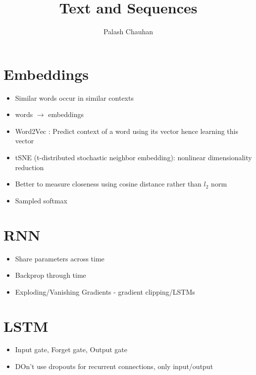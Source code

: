 \documentclass{article}
\begin{document}
\title{Text and Sequences}
\author{Palash Chauhan}

\maketitle

\section{Embeddings}

\begin{itemize}
	\item Similar words occur in similar contexts 
	\item words $\rightarrow$ embeddings
	\item Word2Vec : Predict context of a word using its vector hence learning this vector
	\item tSNE (t-distributed stochastic neighbor embedding): nonlinear dimensionality reduction
	\item Better to measure closeness using cosine distance rather than $l_2$ norm
	\item Sampled softmax
\end{itemize}

\section{RNN}
\begin{itemize}
	\item Share parameters across time
	\item Backprop through time
	\item Exploding/Vanishing Gradients - gradient clipping/LSTMs
\end{itemize}

\section{LSTM}
\begin{itemize}
	\item Input gate, Forget gate, Output gate
	\item DOn't use dropouts for recurrent connections, only input/output
\end{itemize}
\end{document}
